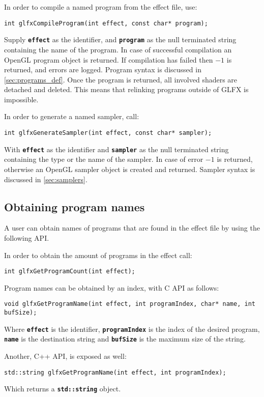 \documentclass[11pt,a4paper,final,titlepage]{article}
\let\orgautoref\autoref
\renewcommand{\autoref}{%
\def\sectionautorefname{Sec.}%
\def\subsectionautorefname{Sec.}%
\def\algocflineautorefname{Alg.}%
\def\lemmaautorefname{Lemma}%
\orgautoref}
\begin{document}
In order to compile a named program from the effect file, use:

\begin{lstlisting}
int glfxCompileProgram(int effect, const char* program);
\end{lstlisting}
Supply \texttt{\textbf{effect}} as the identifier, and \texttt{\textbf{program}} as the null
terminated string containing the name of the program.
In case of successful compilation an OpenGL program object is returned. If compilation has failed
then $-1$ is returned, and errors are logged. Program syntax is discussed in \autoref{sec:programs_def}.
Once the program is returned, all involved shaders are detached and deleted. This means that relinking
programs outside of GLFX is impossible.

In order to generate a named sampler, call:

\begin{lstlisting}
int glfxGenerateSampler(int effect, const char* sampler);
\end{lstlisting}
With \texttt{\textbf{effect}} as the identifier and \texttt{\textbf{sampler}} as the null terminated
string containing the type or the name of the sampler.
In case of error $-1$ is returned, otherwise an OpenGL sampler object is created and returned.
Sampler syntax is discussed in \autoref{sec:samplers}.

\subsection{Obtaining program names}
A user can obtain names of programs that are found in the effect file by using the following API.

In order to obtain the amount of programs in the effect call:
\begin{lstlisting}
int glfxGetProgramCount(int effect);
\end{lstlisting}

Program names can be obtained by an index, with C API as follows:
\begin{lstlisting}
void glfxGetProgramName(int effect, int programIndex, char* name, int bufSize);
\end{lstlisting}
Where \texttt{\textbf{effect}} is the identifier, \texttt{\textbf{programIndex}} is the index of
the desired program, \texttt{\textbf{name}} is the destination
string and \texttt{\textbf{bufSize}} is the maximum size of the string.

Another, C++ API, is exposed as well:
\begin{lstlisting}
std::string glfxGetProgramName(int effect, int programIndex);
\end{lstlisting}
Which returns a \texttt{\textbf{std::string}} object.
\end{document}

